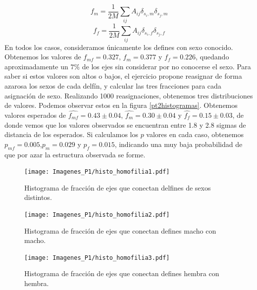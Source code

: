 \documentclass{article}
\begin{document}
\begin{equation}
        f_{m} = \frac{1}{2M}\sum_{ij} A_{ij} \delta_{s_i,m} \delta_{s_j,m} 
\end{equation}
\begin{equation}
        f_{f} = \frac{1}{2M}\sum_{ij} A_{ij} \delta_{s_i,f} \delta_{s_j,f} 
\end{equation}
En todos los casos, consideramos únicamente los defines con sexo conocido. Obtenemos los valores de $f_{mf} = 0.327$, $f_{m} = 0.377$ y $f_{f} = 0.226$, quedando aproximadamente un $7\%$ de los ejes sin considerar por no conocerse el sexo. Para saber si estos valores son altos o bajos, el ejercicio propone reasignar de forma azarosa los sexos de cada delfín, y calcular las tres fracciones para cada asignación de sexo. Realizando 1000 reasignaciones, obtenemos tres distribuciones de valores. Podemos observar estos en la figura \ref{pt2histogramas}. Obtenemos valores esperados de $\widehat{f_{mf}} = 0.43 \pm 0.04$, $\widehat{f_{m}} = 0.30 \pm 0.04$ y $\widehat{f_{f}} = 0.15 \pm 0.03$, de donde vemos que los valores observados se encuentran entre 1.8 y 2.8 sigmas de distancia de los esperados. Si calculamos los $p$ valores en cada caso, obtenemos $p_{mf} = 0.005$,$p_m = 0.029$ y $p_f = 0.015$, indicando una muy baja probabilidad de que por azar la estructura observada se forme.

\begin{figure}[!htb]
   \begin{minipage}{0.3\textwidth}
	\centering
	\texttt{[image: Imagenes\_P1/histo\_homofilia1.pdf]}
	\caption{Histograma de fracción de ejes que conectan delfines de sexos distintos.}
	\label{pt2histo-cruces}
   \end{minipage}\hfill
   \begin{minipage}{0.3\textwidth}
	\centering
	\texttt{[image: Imagenes\_P1/histo\_homofilia2.pdf]}
	\caption{Histograma de fracción de ejes que conectan defines macho con macho.}
	\label{pt2histo-mym}
   \end{minipage}\hfill
   \begin{minipage}{0.3\textwidth}
	\centering
	\texttt{[image: Imagenes\_P1/histo\_homofilia3.pdf]}
	\caption{Histograma de fracción de ejes que conectan defines hembra con hembra.}
	\label{pt2histo-fyf}
   \end{minipage}
   \label{pt2layout}
\end{figure}
\end{document}
